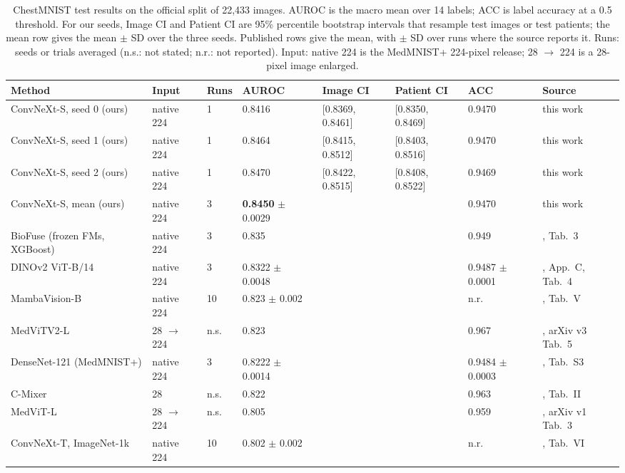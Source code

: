 \begin{table}[t]
\caption{ChestMNIST test results on the official split of 22,433 images. AUROC is the macro mean over 14 labels; ACC is label accuracy at a 0.5 threshold. For our seeds, Image CI and Patient CI are 95\% percentile bootstrap intervals that resample test images or test patients; the mean row gives the mean $\pm$ SD over the three seeds. Published rows give the mean, with $\pm$ SD over runs where the source reports it. Runs: seeds or trials averaged (n.s.: not stated; n.r.: not reported). Input: native 224 is the MedMNIST+ 224-pixel release; 28 $\rightarrow$ 224 is a 28-pixel image enlarged.}
\label{tab:main}
\centering
\footnotesize
\setlength{\tabcolsep}{3.5pt}
\begin{tabular}{@{}llllllll@{}}
\toprule
Method & Input & Runs & AUROC & Image CI & Patient CI & ACC & Source \\
\midrule
ConvNeXt-S, seed 0 (ours) & native 224 & 1 & 0.8416 & [0.8369, 0.8461] & [0.8350, 0.8469] & 0.9470 & this work \\
ConvNeXt-S, seed 1 (ours) & native 224 & 1 & 0.8464 & [0.8415, 0.8512] & [0.8403, 0.8516] & 0.9470 & this work \\
ConvNeXt-S, seed 2 (ours) & native 224 & 1 & 0.8470 & [0.8422, 0.8515] & [0.8408, 0.8522] & 0.9469 & this work \\
ConvNeXt-S, mean (ours) & native 224 & 3 & \textbf{0.8450} $\pm$ 0.0029 & & & 0.9470 & this work \\
\midrule
BioFuse (frozen FMs, XGBoost) & native 224 & 3 & 0.835 & & & 0.949 & \cite{hossain2026biofuse}, Tab.~3 \\
DINOv2 ViT-B/14 & native 224 & 3 & 0.8322 $\pm$ 0.0048 & & & 0.9487 $\pm$ 0.0001 & \cite{wu2025rethinking}, App.~C, Tab.~4 \\
MambaVision-B & native 224 & 10 & 0.823 $\pm$ 0.002 & & & n.r. & \cite{farooq2026mambavision}, Tab.~V \\
MedViTV2-L & 28 $\rightarrow$ 224 & n.s. & 0.823 & & & 0.967 & \cite{manzari2025medvitv2}, arXiv v3 Tab.~5 \\
DenseNet-121 (MedMNIST+) & native 224 & 3 & 0.8222 $\pm$ 0.0014 & & & 0.9484 $\pm$ 0.0003 & \cite{doerrich2025medmnistplus}, Tab.~S3 \\
C-Mixer & 28 & n.s. & 0.822 & & & 0.963 & \cite{zheng2023cmixer}, Tab.~II \\
MedViT-L & 28 $\rightarrow$ 224 & n.s. & 0.805 & & & 0.959 & \cite{manzari2023medvit}, arXiv v1 Tab.~3 \\
ConvNeXt-T, ImageNet-1k & native 224 & 10 & 0.802 $\pm$ 0.002 & & & n.r. & \cite{farooq2026mambavision}, Tab.~VI \\

\end{tabular}
\end{table}
